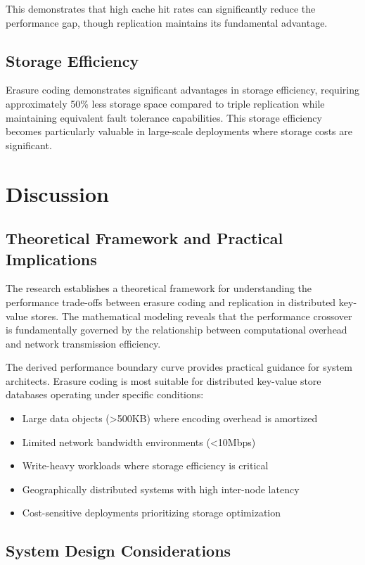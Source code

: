 This demonstrates that high cache hit rates can significantly reduce the performance gap, though replication maintains its fundamental advantage.

\subsection{Storage Efficiency}

Erasure coding demonstrates significant advantages in storage efficiency, requiring approximately 50\% less storage space compared to triple replication while maintaining equivalent fault tolerance capabilities. This storage efficiency becomes particularly valuable in large-scale deployments where storage costs are significant.

\section{Discussion}

\subsection{Theoretical Framework and Practical Implications}

The research establishes a theoretical framework for understanding the performance trade-offs between erasure coding and replication in distributed key-value stores. The mathematical modeling reveals that the performance crossover is fundamentally governed by the relationship between computational overhead and network transmission efficiency.

The derived performance boundary curve provides practical guidance for system architects. Erasure coding is most suitable for distributed key-value store databases operating under specific conditions:
\begin{itemize}
\item Large data objects (>500KB) where encoding overhead is amortized
\item Limited network bandwidth environments (<10Mbps)
\item Write-heavy workloads where storage efficiency is critical
\item Geographically distributed systems with high inter-node latency
\item Cost-sensitive deployments prioritizing storage optimization
\end{itemize}

\subsection{System Design Considerations}

